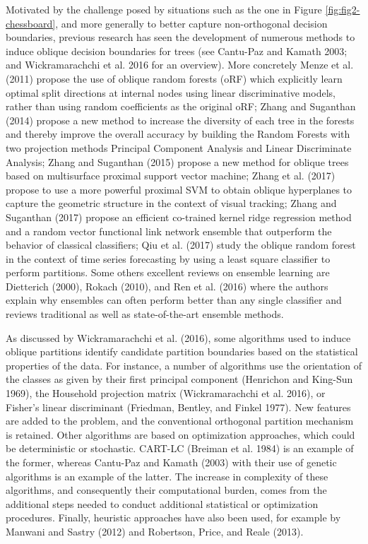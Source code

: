 \documentclass[]{elsarticle} %
\begin{document}
Motivated by the challenge posed by situations such as the one in Figure
\ref{fig:fig2-chessboard}, and more generally to better capture
non-orthogonal decision boundaries, previous research has seen the
development of numerous methods to induce oblique decision boundaries
for trees (see Cantu-Paz and Kamath 2003; and Wickramarachchi et al.
2016 for an overview). More concretely Menze et al. (2011) propose the
use of oblique random forests (oRF) which explicitly learn optimal split
directions at internal nodes using linear discriminative models, rather
than using random coefficients as the original oRF; Zhang and Suganthan
(2014) propose a new method to increase the diversity of each tree in
the forests and thereby improve the overall accuracy by building the
Random Forests with two projection methods Principal Component Analysis
and Linear Discriminate Analysis; Zhang and Suganthan (2015) propose a
new method for oblique trees based on multisurface proximal support
vector machine; Zhang et al. (2017) propose to use a more powerful
proximal SVM to obtain oblique hyperplanes to capture the geometric
structure in the context of visual tracking; Zhang and Suganthan (2017)
propose an efficient co-trained kernel ridge regression method and a
random vector functional link network ensemble that outperform the
behavior of classical classifiers; Qiu et al. (2017) study the oblique
random forest in the context of time series forecasting by using a least
square classifier to perform partitions. Some others excellent reviews
on ensemble learning are Dietterich (2000), Rokach (2010), and Ren et
al. (2016) where the authors explain why ensembles can often perform
better than any single classifier and reviews traditional as well as
state-of-the-art ensemble methods.

As discussed by Wickramarachchi et al. (2016), some algorithms used to
induce oblique partitions identify candidate partition boundaries based
on the statistical properties of the data. For instance, a number of
algorithms use the orientation of the classes as given by their first
principal component (Henrichon and King-Sun 1969), the Household
projection matrix (Wickramarachchi et al. 2016), or Fisher's linear
discriminant (Friedman, Bentley, and Finkel 1977). New features are
added to the problem, and the conventional orthogonal partition
mechanism is retained. Other algorithms are based on optimization
approaches, which could be deterministic or stochastic. CART-LC (Breiman
et al. 1984) is an example of the former, whereas Cantu-Paz and Kamath
(2003) with their use of genetic algorithms is an example of the latter.
The increase in complexity of these algorithms, and consequently their
computational burden, comes from the additional steps needed to conduct
additional statistical or optimization procedures. Finally, heuristic
approaches have also been used, for example by Manwani and Sastry (2012)
and Robertson, Price, and Reale (2013).
\end{document}
